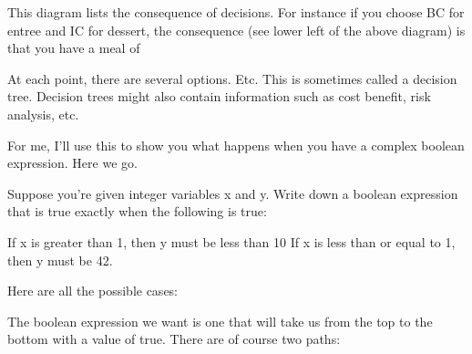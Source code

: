 {{{{{{This diagram lists the consequence of decisions. For instance if you
choose BC for entree and IC for dessert, the consequence (see lower left
of the above diagram) is that you have a meal of


At each point, there are several options. Etc. This is sometimes called a
decision tree. Decision trees might also contain information such as cost
benefit, risk analysis, etc.

For me, I'll use this to show you what happens when you have a
complex boolean expression. Here we go.

Suppose you're given integer variables x and y. Write down a boolean
expression that is true exactly when the following is true:

\begin{tightlist}
\li If x is greater than 1, then y must be less than 10
\li If x is less than or equal to 1, then y must be 42.
\end{tightlist}

Here are all the possible cases:


The boolean expression we want is one that will take us from the top to
the bottom with a value of true. There are of course two paths:

}}}}}}
